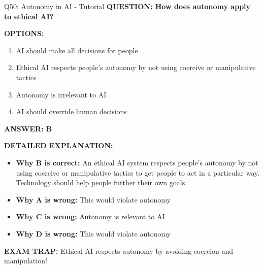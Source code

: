 \documentclass[8pt]{beamer}
\begin{document}
	\begin{frame}{Q50: Autonomy in AI - Tutorial}
		\fontsize{6.5}{7.5}\selectfont
		\textbf{QUESTION: How does autonomy apply to ethical AI?}
		
		\vspace{0.1cm}
		\textbf{OPTIONS:}
		\begin{enumerate}
			\item AI should make all decisions for people
			\item Ethical AI respects people's autonomy by not using coercive or manipulative tactics
			\item Autonomy is irrelevant to AI
			\item AI should override human decisions
		\end{enumerate}
		
		\vspace{0.1cm}
		\textcolor{myblue}{\textbf{ANSWER: B}}
		
		\vspace{0.1cm}
		\textbf{DETAILED EXPLANATION:}
		\begin{itemize}
			\item \textbf{Why B is correct:} An ethical AI system respects people's autonomy by not using coercive or manipulative tactics to get people to act in a particular way. Technology should help people further their own goals.
			\item \textbf{Why A is wrong:} This would violate autonomy
			\item \textbf{Why C is wrong:} Autonomy is relevant to AI
			\item \textbf{Why D is wrong:} This would violate autonomy
		\end{itemize}
		
		\textcolor{myred}{\textbf{EXAM TRAP:}} Ethical AI respects \textcolor{myblue}{autonomy by avoiding coercion and manipulation}!
	\end{frame}
	
\end{document}
